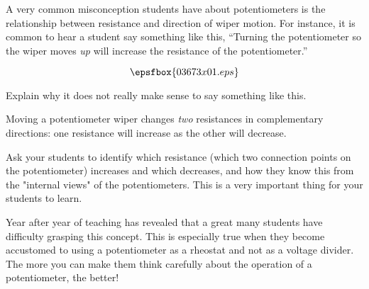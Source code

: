 

A very common misconception students have about potentiometers is the relationship between resistance and direction of wiper motion.  For instance, it is common to hear a student say something like this, ``Turning the potentiometer so the wiper moves {\it up} will increase the resistance of the potentiometer.''

$$\epsfbox{03673x01.eps}$$

Explain why it does not really make sense to say something like this.







Moving a potentiometer wiper changes {\it two} resistances in complementary directions: one resistance will increase as the other will decrease.







Ask your students to identify which resistance (which two connection points on the potentiometer) increases and which decreases, and how they know this from the "internal views" of the potentiometers.  This is a very important thing for your students to learn.

Year after year of teaching has revealed that a great many students have difficulty grasping this concept.  This is especially true when they become accustomed to using a potentiometer as a rheostat and not as a voltage divider.  The more you can make them think carefully about the operation of a potentiometer, the better!




